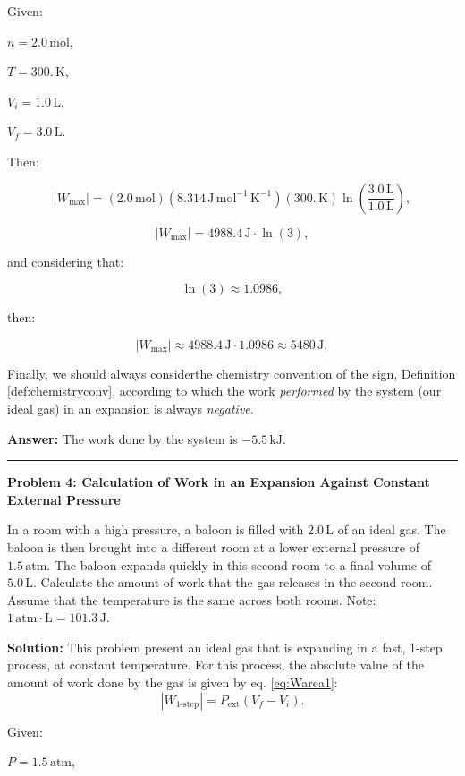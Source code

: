 \documentclass[
  9pt,
]{extbook}
\theoremstyle{definition}
\theoremstyle{definition}
\theoremstyle{definition}
\theoremstyle{remark}
\begin{document}
Given:

\(n=2.0\,\text{mol}\),

\(T=300.\,\text{K}\),

\(V_i=1.0\,\text{L}\),

\(V_f=3.0\,\text{L}\).

Then:

\[\left| W_{\text{max}} \right|=(2.0\,\text{mol})(8.314\,\text{J} \, \text{mol}^{-1} \, \text{K}^{-1})(300.\,\text{K})\ln\left(\frac{3.0\,\text{L}}{1.0\,\text{L}}\right),\]

\[\left| W_{\text{max}} \right|=4988.4\,\text{J}\cdot \ln(3),\]

and considering that:

\[\ln(3)\approx 1.0986,\]

then:

\[\left| W_{\text{max}} \right|\approx 4988.4\,\text{J} \cdot 1.0986 \approx 5480\,\text{J},\]

Finally, we should always considerthe chemistry convention of the sign, Definition \ref{def:chemistryconv}, according to which the work \emph{performed} by the system (our ideal gas) in an expansion is always \emph{negative}.

\textbf{Answer:} The work done by the system is \(-5.5\,\text{kJ}\).

\begin{center}\rule{0.5\linewidth}{0.5pt}\end{center}

\textbf{Problem 4: Calculation of Work in an Expansion Against Constant External Pressure}

In a room with a high pressure, a baloon is filled with \(2.0\,\text{L}\) of an ideal gas. The baloon is then brought into a different room at a lower external pressure of \(1.5\,\text{atm}\). The baloon expands quickly in this second room to a final volume of \(5.0\,\text{L}\). Calculate the amount of work that the gas releases in the second room. Assume that the temperature is the same across both rooms. Note: \(1 \,\text{atm}\cdotp\text{L} = 101.3\,\text{J}\).

\textbf{Solution:} This problem present an ideal gas that is expanding in a fast, 1-step process, at constant temperature. For this process, the absolute value of the amount of work done by the gas is given by eq. \eqref{eq:Warea1}: \[  \left| W_{\text{1-step}} \right| = P_{\text{ext}} (V_f-V_i).\]

Given:

\(P=1.5\,\text{atm}\),
\end{document}
